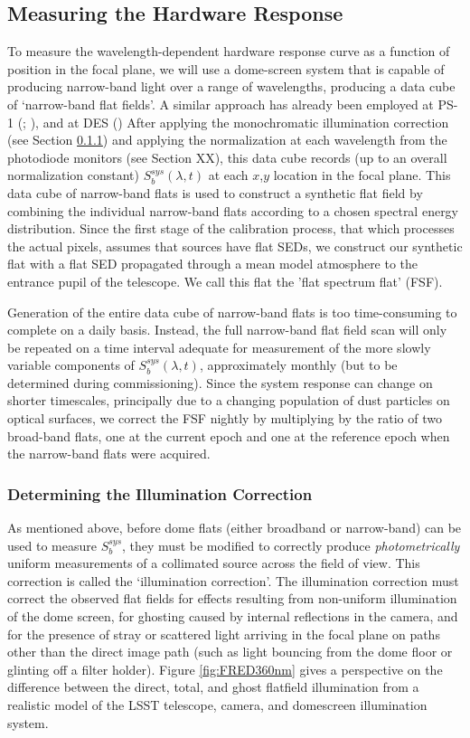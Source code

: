 \documentclass[12pt,preprint]{aastex}
\begin{document}
\subsection{Measuring the Hardware Response}
To measure the wavelength-dependent hardware response
curve as a function of position in the focal plane, we will use a
dome-screen system that is capable of producing narrow-band light 
over a range of wavelengths, producing a data cube of `narrow-band flat
fields'.  A similar approach has already been employed at PS-1 (\citep{StubbsTonry2012}; \citep{Tonry2012}), 
and at DES (\citep{Marshall2013})
After applying the monochromatic illumination correction 
(see Section \ref{sec:ic}) and applying the normalization at each wavelength from
the photodiode monitors (see Section XX),  this data cube
records (up to an overall normalization constant) $S_b^{sys}(\lambda,t)$ at each $x$,$y$ location in the focal plane. 
This data cube of narrow-band
flats is used to construct a synthetic flat field by
combining the individual narrow-band flats according to a chosen
spectral energy distribution.  Since the first stage of the calibration process, that which
processes the actual pixels, assumes that sources have flat SEDs, we construct our synthetic flat
with a flat SED propagated through a mean model atmosphere to the entrance pupil of the
telescope.  We call this flat the 'flat spectrum flat' (FSF).

Generation of the entire data cube of
narrow-band flats is too time-consuming to complete on a daily
basis. Instead, the full narrow-band flat field scan will only be
repeated on a time interval adequate for measurement of
the more slowly variable components of $S_b^{sys}(\lambda,t)$, approximately
monthly (but to be determined during commissioning).   Since the system response can change 
on shorter timescales, principally due to a changing population of dust particles on optical surfaces, we correct the FSF
nightly by multiplying by the ratio of two broad-band flats, one at the current epoch and one at the 
reference epoch when the narrow-band flats were acquired.

\subsubsection{Determining the Illumination Correction}
\label{sec:ic}
As mentioned above, before dome flats (either
broadband or narrow-band) can be used to measure
$S_b^{sys}$, they must be modified to correctly produce {\it
photometrically} uniform measurements of a collimated source 
across the field of view. This correction is called the
`illumination correction'.  The illumination correction must correct
the observed flat fields for effects resulting from non-uniform
illumination of the dome screen, for ghosting caused by internal
reflections in the camera, and for the presence of stray or scattered
light arriving in the focal plane on paths other than the direct
image path (such as light bouncing from the dome floor or glinting
off a filter holder). Figure \ref{fig:FRED360nm} gives a perspective
on the difference between the direct, total, and ghost flatfield 
illumination from a realistic model of the LSST telescope, camera,
and domescreen illumination system.
\end{document}
